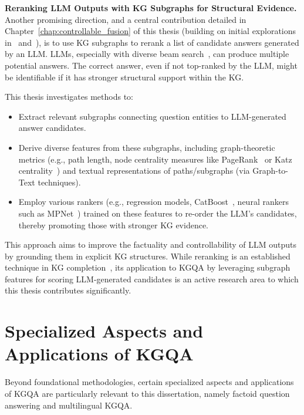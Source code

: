 \textbf{Reranking LLM Outputs with KG Subgraphs for Structural Evidence.}
\label{chap:related_work:reranking_fusion}
Another promising direction, and a central contribution detailed in Chapter~\ref{chap:controllable_fusion} of this thesis (building on initial explorations in~\cite{DBLP:conf/paclic/SalnikovLRNBMP23-originalpaper} and~\cite{DBLP:journals/corr/abs-2310-02166}), is to use KG subgraphs to rerank a list of candidate answers generated by an LLM. LLMs, especially with diverse beam search~\cite{DBLP:journals/corr/VijayakumarCSSL16-diverse-beam-search}, can produce multiple potential answers. The correct answer, even if not top-ranked by the LLM, might be identifiable if it has stronger structural support within the KG.

This thesis investigates methods to:
\begin{itemize}
    \item Extract relevant subgraphs connecting question entities to LLM-generated answer candidates.
    \item Derive diverse features from these subgraphs, including graph-theoretic metrics (e.g., path length, node centrality measures like PageRank~\cite{page1999pagerank} or Katz centrality~\cite{katz1953new}) and textual representations of paths/subgraphs (via Graph-to-Text techniques).
    \item Employ various rankers (e.g., regression models, CatBoost~\cite{DBLP:conf/nips/ProkhorenkovaGV18-catboost}, neural rankers such as MPNet~\cite{DBLP:conf/nips/Song0QLL20}) trained on these features to re-order the LLM's candidates, thereby promoting those with stronger KG evidence.
\end{itemize}
This approach aims to improve the factuality and controllability of LLM outputs by grounding them in explicit KG structures. While reranking is an established technique in KG completion~\cite{DBLP:conf/coling/WangHHLYL24, DBLP:journals/corr/abs-2402-02389}, its application to KGQA by leveraging subgraph features for scoring LLM-generated candidates is an active research area to which this thesis contributes significantly.

\section{Specialized Aspects and Applications of KGQA}
\label{sec:rw_specialized_kgqa}

Beyond foundational methodologies, certain specialized aspects and applications of KGQA are particularly relevant to this dissertation, namely factoid question answering and multilingual KGQA.


